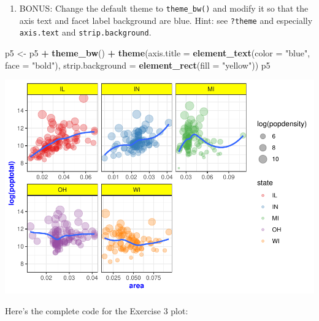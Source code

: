 \documentclass[
]{book}
\newenvironment{Shaded}{\begin{snugshade}}{\end{snugshade}}
\newcommand{\DataTypeTok}[1]{\textcolor[rgb]{0.13,0.29,0.53}{#1}}
\newcommand{\KeywordTok}[1]{\textcolor[rgb]{0.13,0.29,0.53}{\textbf{#1}}}
\newcommand{\NormalTok}[1]{#1}
\newcommand{\OperatorTok}[1]{\textcolor[rgb]{0.81,0.36,0.00}{\textbf{#1}}}
\newcommand{\StringTok}[1]{\textcolor[rgb]{0.31,0.60,0.02}{#1}}
\providecommand{\tightlist}{%
  \setlength{\itemsep}{0pt}\setlength{\parskip}{0pt}}
\begin{document}
\begin{alert}
\begin{enumerate}
\def\labelenumi{\arabic{enumi}.}
\setcounter{enumi}{5}
\tightlist
\item
  BONUS: Change the default theme to \texttt{theme\_bw()} and modify it so that the axis text and facet label background are blue. Hint: see \texttt{?theme} and especially \texttt{axis.text} and \texttt{strip.background}.
\end{enumerate}

\begin{Shaded}
\begin{Highlighting}[]
\NormalTok{p5 \textless{}{-}}\StringTok{ }\NormalTok{p5 }\OperatorTok{+}\StringTok{ }\KeywordTok{theme\_bw}\NormalTok{() }\OperatorTok{+}
\StringTok{    }\KeywordTok{theme}\NormalTok{(}\DataTypeTok{axis.title =} \KeywordTok{element\_text}\NormalTok{(}\DataTypeTok{color =} \StringTok{"blue"}\NormalTok{, }\DataTypeTok{face =} \StringTok{"bold"}\NormalTok{),}
          \DataTypeTok{strip.background =} \KeywordTok{element\_rect}\NormalTok{(}\DataTypeTok{fill =} \StringTok{"yellow"}\NormalTok{))}
\NormalTok{p5}
\end{Highlighting}
\end{Shaded}

\includegraphics{R/Rgraphics/figures/unnamed-chunk-233-1.pdf}

Here's the complete code for the Exercise 3 plot:


\end{alert}
\end{document}
